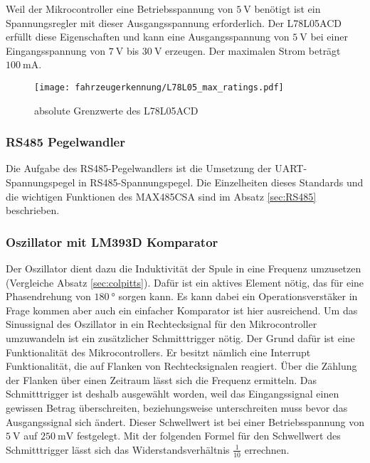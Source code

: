 Weil der Mikrocontroller eine Betriebsspannung von $\SI{5}{\volt}$ benötigt ist ein Spannungsregler mit dieser Ausgangsspannung erforderlich. Der L78L05ACD erfüllt diese Eigenschaften und kann 
eine Ausgangsspannung von $\SI{5}{\volt}$ bei einer Eingangsspannung von $\SI{7}{\volt}$ bis $\SI{30}{\volt}$ erzeugen. Der maximalen Strom beträgt $\SI{100}{\milli\ampere}$.

\begin{figure}[H]
    \centering
    \texttt{[image: fahrzeugerkennung/L78L05\_max\_ratings.pdf]}
    \caption{absolute Grenzwerte des L78L05ACD}
\end{figure}

\subsubsection{RS485 Pegelwandler}

Die Aufgabe des RS485-Pegelwandlers ist die Umsetzung der UART-Spannungspegel in RS485-Spannungspegel. Die Einzelheiten dieses Standards und die wichtigen Funktionen des MAX485CSA 
sind im Absatz \ref{sec:RS485} beschrieben.

\subsubsection{Oszillator mit LM393D Komparator}

Der Oszillator dient dazu die Induktivität der Spule in eine Frequenz umzusetzen (Vergleiche Absatz \ref{sec:colpitts}). Dafür ist ein aktives Element nötig, das für eine Phasendrehung von $\SI{180}{\degree}$ sorgen kann.
Es kann dabei ein Operationsverstäker in Frage kommen aber auch ein einfacher Komparator ist hier ausreichend. Um das Sinussignal des Oszillator in ein Rechtecksignal für den Mikrocontroller umzuwandeln ist ein zusätzlicher Schmitttrigger nötig.
Der Grund dafür ist eine Funktionalität des Mikrocontrollers. Er besitzt nämlich eine Interrupt Funktionalität, die auf Flanken von Rechtecksignalen reagiert. Über die Zählung der Flanken über einen Zeitraum lässt sich die Frequenz ermitteln.
Das Schmitttrigger ist deshalb ausgewählt worden, weil das Eingangssignal einen gewissen Betrag überschreiten, beziehungsweise unterschreiten muss bevor das Ausgangssignal sich ändert. 
Dieser Schwellwert ist bei einer Betriebsspannung von $\SI{5}{\volt}$
auf $\SI{250}{\milli\volt}$ festgelegt. Mit der folgenden Formel für den Schwellwert des Schmitttrigger lässt sich das Widerstandsverhältnis $\frac{1}{10}$ errechnen.

